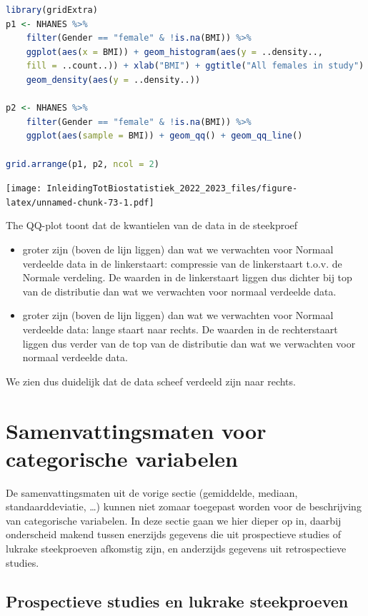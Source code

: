 \documentclass[
  12pt,dutch,coursenotes]{book}
\begin{document}
\begin{lstlisting}[language=R]
library(gridExtra)
p1 <- NHANES %>%
    filter(Gender == "female" & !is.na(BMI)) %>%
    ggplot(aes(x = BMI)) + geom_histogram(aes(y = ..density..,
    fill = ..count..)) + xlab("BMI") + ggtitle("All females in study") +
    geom_density(aes(y = ..density..))

p2 <- NHANES %>%
    filter(Gender == "female" & !is.na(BMI)) %>%
    ggplot(aes(sample = BMI)) + geom_qq() + geom_qq_line()

grid.arrange(p1, p2, ncol = 2)
\end{lstlisting}

\texttt{[image: InleidingTotBiostatistiek\_2022\_2023\_files/figure-latex/unnamed-chunk-73-1.pdf]}

The QQ-plot toont dat de kwantielen van de data in de steekproef

\begin{itemize}
\item
  groter zijn (boven de lijn liggen) dan wat we verwachten voor Normaal verdeelde data in de linkerstaart: compressie van de linkerstaart t.o.v. de Normale verdeling. De waarden in de linkerstaart liggen dus dichter bij top van de distributie dan wat we verwachten voor normaal verdeelde data.
\item
  groter zijn (boven de lijn liggen) dan wat we verwachten voor Normaal verdeelde data: lange staart naar rechts. De waarden in de rechterstaart liggen dus verder van de top van de distributie dan wat we verwachten voor normaal verdeelde data.
\end{itemize}

We zien dus duidelijk dat de data scheef verdeeld zijn naar rechts.

\hypertarget{sec:explCatVar}{%
\section{Samenvattingsmaten voor categorische variabelen}\label{sec:explCatVar}}

De samenvattingsmaten uit de vorige sectie (gemiddelde, mediaan, standaarddeviatie, \ldots) kunnen niet zomaar toegepast worden voor de beschrijving van categorische variabelen. In deze sectie gaan we hier dieper op in, daarbij onderscheid makend tussen enerzijds gegevens die uit prospectieve studies of lukrake steekproeven afkomstig zijn, en anderzijds gegevens uit retrospectieve studies.

\hypertarget{prospectieve-studies-en-lukrake-steekproeven}{%
\subsection{Prospectieve studies en lukrake steekproeven}\label{prospectieve-studies-en-lukrake-steekproeven}}
\end{document}
